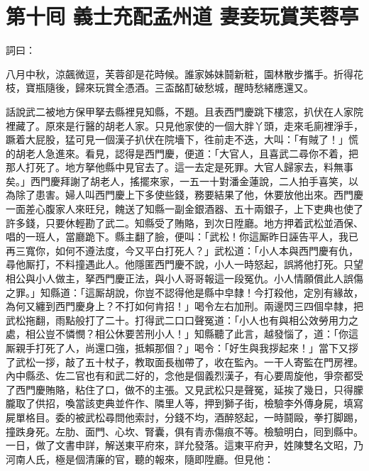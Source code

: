 
\chapter*{第十囘 義士充配孟州道 妻妾玩賞芙蓉亭}


詞曰：

\begin{myquote}
八月中秋，涼飆微逗，芙蓉卻是花時候。誰家姊妹鬪新粧，園林散步攜手。折得花枝，寶瓶隨後，歸來玩賞全憑酒。三盃酩酊破愁城，醒時愁緒應還又。

\end{myquote}

話說武二被地方保甲拏去縣裡見知縣，不題。且表西門慶跳下樓窓，扒伏在人家院裡藏了。原來是行醫的胡老人家。只見他家使的一個大胖丫頭，走來毛廁裡淨手，蹶着大屁股，猛可見一個漢子扒伏在院墻下，徃前走不迭，大叫：「有賊了！」{}慌的胡老人急進來。看見，認得是西門慶，便道：「大官人，且喜武二尋你不着，把那人打死了。地方拏他縣中見官去了。這一去定是死罪。大官人歸家去，料無事矣。」西門慶拜謝了胡老人，搖擺來家，一五一十對潘金蓮說，二人拍手喜笑，以為除了患害。{}婦人叫西門慶上下多使些錢，務要結果了他，休要放他出來。西門慶一面差心腹家人來旺兒，餽送了知縣一副金銀酒器、五十兩銀子，上下吏典也使了許多錢，只要休輕勘了武二。知縣受了賄賂，到次日陞廳。地方押着武松並酒保、唱的一班人，當廳跪下。縣主翻了臉，便叫：「武松！你這厮昨日誣告平人，我已再三寬你，如何不遵法度，今又平白打死人？」武松道：「小人本與西門慶有仇，尋他厮打，不料撞遇此人。他隱匿西門慶不說，小人一時怒起，誤將他打死。只望相公與小人做主，拏西門慶正法，與小人哥哥報這一段冤仇。小人情願償此人誤傷之罪。」知縣道：「這厮胡說，你豈不認得他是縣中皁隸！今打殺他，定別有緣故，為何又纏到西門慶身上？不打如何肯招！」喝令左右加刑。兩邊閃三四個皁隸，把武松拖翻，雨點般打了二十。打得武二口口聲冤道：「小人也有與相公效勞用力之處，相公豈不憐憫？相公休要苦刑小人！」知縣聽了此言，越發惱了，道：「你這厮親手打死了人，尚還口強，抵賴那個？」喝令：「好生與我拶起來！」當下又拶了武松一拶，敲了五十杖子，教取面長枷帶了，收在監內。一干人寄監在門房裡。內中縣丞、佐二官也有和武二好的，念他是個義烈漢子，有心要周旋他，爭奈都受了西門慶賄賂，粘住了口，做不的主張。又見武松只是聲冤，延挨了幾日，只得朦朧取了供招，喚當該吏典並仵作、隣里人等，押到獅子街，檢驗李外傳身屍，填寫屍單格目。委的被武松尋問他索討，分錢不均，酒醉怒起，一時鬪毆，拳打脚踢，撞跌身死。左肋、面門、心坎、腎囊，俱有青赤傷痕不等。檢驗明白，囘到縣中。一日，做了文書申詳，解送東平府來，詳允發落。這東平府尹，姓陳雙名文昭，乃河南人氏，極是個清廉的官，聽的報來，隨即陞廳。但見他：

